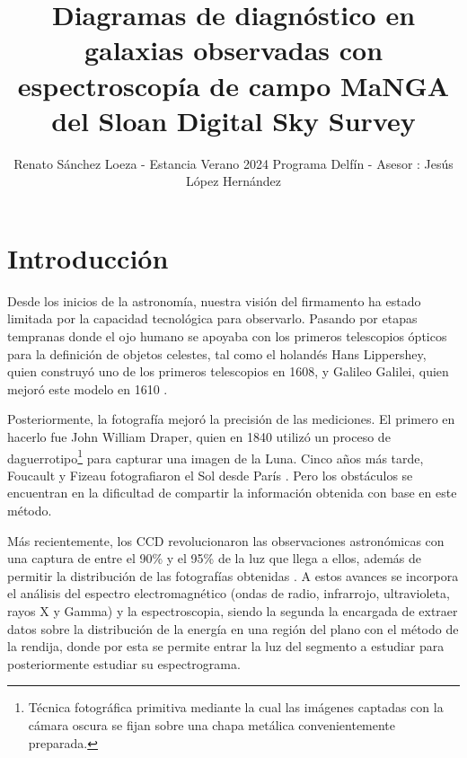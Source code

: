 \documentclass[10pt,twocolumn,a4paper]{opticajnl}
\title{Diagramas de diagnóstico en galaxias observadas con espectroscopía de campo MaNGA del Sloan Digital Sky Survey}
\author{Renato Sánchez Loeza - Estancia Verano 2024 Programa Delfín - Asesor : Jesús López Hernández}
\begin{document}
\maketitle
\section*{Introducción}
Desde los inicios de la astronomía, nuestra visión del firmamento ha estado limitada por la capacidad tecnológica para observarlo. Pasando por etapas tempranas donde el ojo humano se apoyaba con los primeros telescopios ópticos para la definición de objetos celestes, tal como el holandés Hans Lippershey, quien construyó uno de los primeros telescopios en 1608, y Galileo Galilei, quien mejoró este modelo en 1610 \cite{cana-2015}.

Posteriormente, la fotografía mejoró la precisión de las mediciones. El primero en hacerlo fue John William Draper, quien en 1840 utilizó un proceso de daguerrotipo\footnote{Técnica fotográfica primitiva mediante la cual las imágenes captadas con la cámara oscura se fijan sobre una chapa metálica convenientemente preparada.} para capturar una imagen de la Luna. Cinco años más tarde, Foucault y Fizeau fotografiaron el Sol desde París \cite{olsen2021birth}. Pero los obstáculos se encuentran en la dificultad de compartir la información obtenida con base en este método.

Más recientemente, los CCD revolucionaron las observaciones astronómicas con una captura de entre el 90\% y el 95\% de la luz que llega a ellos, además de permitir la distribución de las fotografías obtenidas \cite{las-cumbres}. A estos avances se incorpora el análisis del espectro electromagnético (ondas de radio, infrarrojo, ultravioleta, rayos X y Gamma) y la espectroscopia, siendo la segunda la encargada de extraer datos sobre la distribución de la energía en una región del plano con el método de la rendija, donde por esta se permite entrar la luz del segmento a estudiar para posteriormente estudiar su espectrograma.
\end{document}
